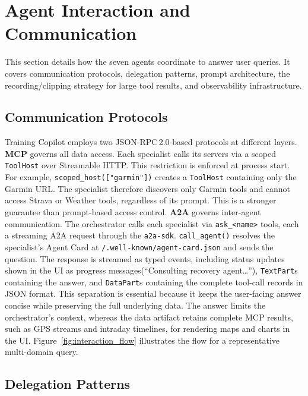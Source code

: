 \section{Agent Interaction and Communication}\label{sec:agents}

This section details how the seven agents coordinate to answer user queries. It covers communication protocols, delegation patterns, prompt architecture, the recording/clipping strategy for large tool results, and observability infrastructure.

\subsection{Communication Protocols}\label{sec:agents:protocols}

Training Copilot employs two JSON-RPC\,2.0-based protocols at different layers. \textbf{MCP} governs all data access. Each specialist calls its servers via a scoped \texttt{ToolHost} over Streamable HTTP. This restriction is enforced at process start. For example, \texttt{scoped\_host(["garmin"])} creates a \texttt{ToolHost} containing only the Garmin URL. The specialist therefore discovers only Garmin tools and cannot access Strava or Weather tools, regardless of its prompt. This is a stronger guarantee than prompt-based access control. \textbf{A2A} governs inter-agent communication. The orchestrator calls each specialist via \texttt{ask\_<name>} tools, each a streaming A2A request through the \texttt{a2a-sdk}. \texttt{call\_agent()} resolves the specialist's Agent Card at \texttt{/.well-known/agent-card.json} and sends the question. The response is streamed as typed events, including status updates shown in the UI as progress messages(``Consulting recovery agent\ldots''), \texttt{TextPart}s containing the answer, and \texttt{DataPart}s containing the complete tool-call records in JSON format. This separation is essential because it keeps the user-facing answer concise while preserving the full underlying data. The answer limits the orchestrator’s context, whereas the data artifact retains complete MCP results, such as GPS streams and intraday timelines, for rendering maps and charts in the UI. Figure~\ref{fig:interaction_flow} illustrates the flow for a representative multi-domain query.



\subsection{Delegation Patterns}\label{sec:agents:delegation}


